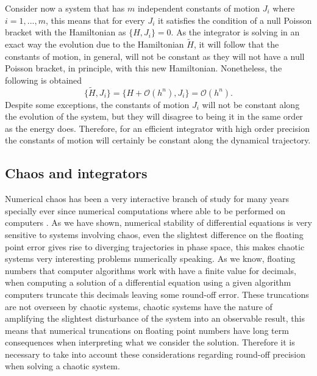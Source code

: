 Consider now a system that has $m$ independent constants of motion $J_i$ where $i=1,...,m$, this means that for every $J_i$ it satisfies the condition of a null Poisson bracket with the Hamiltonian as $\{H,J_i\}=0$. As the integrator is solving in an exact way the evolution due to the Hamiltonian $\tilde{H}$, it will follow that the constants of motion, in general, will not be constant as they will not have a null Poisson bracket, in principle, with this new Hamiltonian. Nonetheless, the following is obtained
\begin{equation}
\{\tilde{H},J_i\}=\{H+\mathcal{O}(h^n),J_i\}=\mathcal{O}(h^n).
\end{equation}
Despite some exceptions, the constants of motion $J_i$ will not be constant along the evolution of the system, but they will disagree to being it in the same order as the energy does. Therefore, for an efficient integrator with high order precision the constants of motion will certainly be constant along the dynamical trajectory.

\subsection{Chaos and integrators}

Numerical chaos has been a very interactive branch of study for many years specially ever since numerical computations where able to be performed on computers . As we have shown, numerical stability of differential equations is very sensitive to systems involving chaos, even the slightest difference on the floating point error gives rise to diverging trajectories in phase space, this makes chaotic systems very interesting problems numerically speaking. As we know, floating numbers that computer algorithms work with have a finite value for decimals, when computing a solution of a differential equation using a given algorithm computers truncate this decimals leaving some round-off error. These truncations are not overseen by chaotic systems, chaotic systems have the nature of amplifying the slightest disturbance of the system into an observable result, this means that numerical truncations on floating point numbers have long term consequences when interpreting what we consider the solution. Therefore it is necessary to take into account these considerations regarding round-off precision when solving a chaotic system.\par

